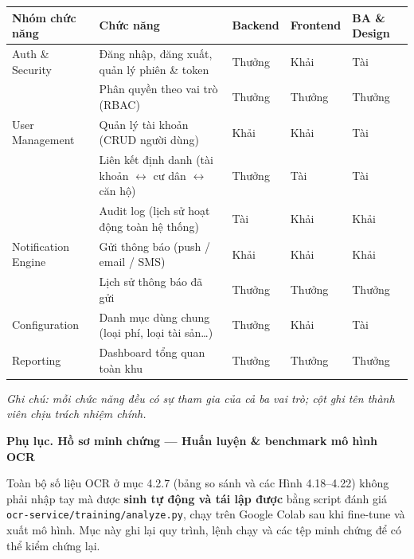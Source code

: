 \begin{center}{\small\singlespacing\renewcommand{\arraystretch}{1.3}
\begin{tabular}{|>{\raggedright\arraybackslash}p{}|>{\raggedright\arraybackslash}p{}|>{\centering\arraybackslash}p{}|>{\centering\arraybackslash}p{}|>{\centering\arraybackslash}p{}|}
\hline
\textbf{Nhóm chức năng} & \textbf{Chức năng} & \textbf{Backend} & \textbf{Frontend} & \textbf{BA \& Design} \\ \hline
Auth \& Security & Đăng nhập, đăng xuất, quản lý phiên \& token & Thưởng & Khải & Tài \\ \hline
 & Phân quyền theo vai trò (RBAC) & Thưởng & Thưởng & Thưởng \\ \hline
User Management & Quản lý tài khoản (CRUD người dùng) & Khải & Khải & Tài \\ \hline
 & Liên kết định danh (tài khoản $\leftrightarrow$ cư dân $\leftrightarrow$ căn hộ) & Thưởng & Tài & Tài \\ \hline
 & Audit log (lịch sử hoạt động toàn hệ thống) & Tài & Khải & Khải \\ \hline
Notification Engine & Gửi thông báo (push / email / SMS) & Khải & Khải & Khải \\ \hline
 & Lịch sử thông báo đã gửi & Thưởng & Thưởng & Thưởng \\ \hline
Configuration & Danh mục dùng chung (loại phí, loại tài sản\ldots{}) & Thưởng & Khải & Tài \\ \hline
Reporting & Dashboard tổng quan toàn khu & Thưởng & Thưởng & Thưởng \\ \hline
\end{tabular}}\end{center}
\textit{Ghi chú: mỗi chức năng đều có sự tham gia của cả ba vai trò; cột ghi tên thành viên chịu trách nhiệm chính.}





\bigskip
\textbf{Phụ lục. Hồ sơ minh chứng — Huấn luyện \& benchmark mô hình OCR}

Toàn bộ số liệu OCR ở mục 4.2.7 (bảng so sánh và các Hình 4.18–4.22) không phải nhập tay mà được \textbf{sinh tự động và tái lập được} bằng script đánh giá \texttt{ocr-service/training/analyze.py}, chạy trên Google Colab sau khi fine-tune và xuất mô hình. Mục này ghi lại quy trình, lệnh chạy và các tệp minh chứng để có thể kiểm chứng lại.

